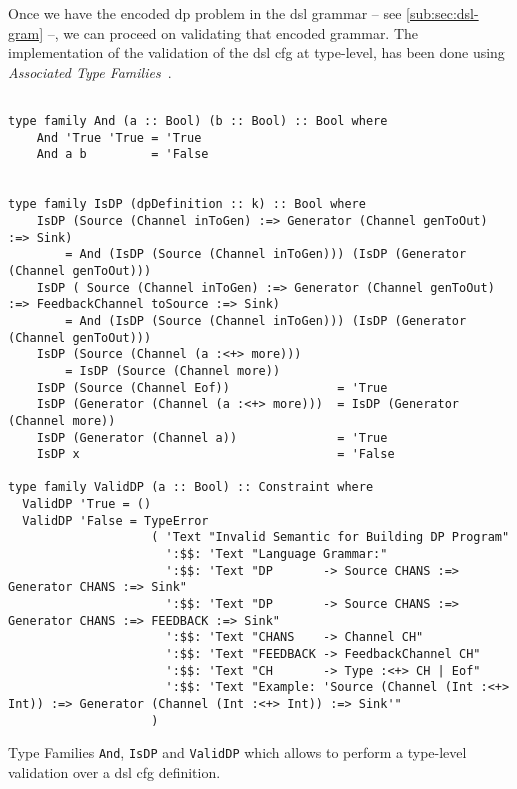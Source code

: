 Once we have the encoded \acrshort{dp} problem in the \acrshort{dsl} grammar -- see \autoref{sub:sec:dsl-gram} --, we can proceed on validating that encoded grammar. 
The implementation of the validation of the \acrshort{dsl} \acrshort{cfg} at type-level, has been done using \emph{Associated Type Families}~\cite{associated-types}.

\begin{listing}[H]
  \begin{verbatim}

type family And (a :: Bool) (b :: Bool) :: Bool where
    And 'True 'True = 'True
    And a b         = 'False
  

type family IsDP (dpDefinition :: k) :: Bool where
    IsDP (Source (Channel inToGen) :=> Generator (Channel genToOut) :=> Sink)
        = And (IsDP (Source (Channel inToGen))) (IsDP (Generator (Channel genToOut)))
    IsDP ( Source (Channel inToGen) :=> Generator (Channel genToOut) :=> FeedbackChannel toSource :=> Sink)
        = And (IsDP (Source (Channel inToGen))) (IsDP (Generator (Channel genToOut)))
    IsDP (Source (Channel (a :<+> more)))     
        = IsDP (Source (Channel more))
    IsDP (Source (Channel Eof))               = 'True
    IsDP (Generator (Channel (a :<+> more)))  = IsDP (Generator (Channel more))
    IsDP (Generator (Channel a))              = 'True
    IsDP x                                    = 'False
     
type family ValidDP (a :: Bool) :: Constraint where
  ValidDP 'True = ()
  ValidDP 'False = TypeError
                    ( 'Text "Invalid Semantic for Building DP Program"
                      ':$$: 'Text "Language Grammar:"
                      ':$$: 'Text "DP       -> Source CHANS :=> Generator CHANS :=> Sink"
                      ':$$: 'Text "DP       -> Source CHANS :=> Generator CHANS :=> FEEDBACK :=> Sink"
                      ':$$: 'Text "CHANS    -> Channel CH"
                      ':$$: 'Text "FEEDBACK -> FeedbackChannel CH"
                      ':$$: 'Text "CH       -> Type :<+> CH | Eof"
                      ':$$: 'Text "Example: 'Source (Channel (Int :<+> Int)) :=> Generator (Channel (Int :<+> Int)) :=> Sink'"
                    )
  \end{verbatim}
  \caption[{[\texttt{Stage.hs}] Validating encoded in $G_{dsl}$ - FCF}]{Type Families \texttt{And}, \texttt{IsDP} and \texttt{ValidDP} which allows to perform a type-level validation over a \acrshort{dsl} \acrshort{cfg} definition.}
  \label{src:dpfh:4}
\end{listing}

